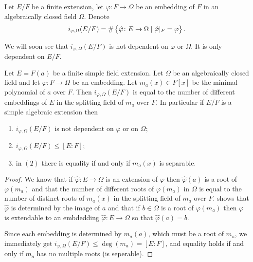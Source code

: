 \documentclass[11pt,a4paper]{article}
\begin{document}
\begin{definition}
  Let $E/F$ be a finite extension,
  let $\varphi \colon F \to \Omega$ be an embedding of $F$ in
  an algebraically closed field $\Omega$.
  Denote
  \[
    i_{\varphi,\Omega}(E/F) =
    \# \left\{\hat \varphi \colon E \to \Omega \mid
    \hat \varphi \vert_F = \varphi\right\}.
  \]
\end{definition}

\begin{remark}
  We will soon see that $i_{\varphi,\Omega}(E/F)$
  is not dependent on $\varphi$ or $\Omega$.
  It is only dependent on $E/F$.
\end{remark}

\begin{lemma}
  \label{lem:i}
  Let $E = F(a)$ be a finite simple field extension.
  Let $\Omega$ be an algebraically closed field and let
  $\varphi \colon F \to \Omega$ be an embedding.
  Let $m_a(x) \in F[x]$ be the minimal polynomial of $a$ over $F$.
  Then $i_{\varphi,\Omega}(E/F)$ is equal to the number of different
  embeddings of $E$ in the splitting field of $m_a$ over $F$.
  In particular if $E/F$ is a simple algebraic extension then
  \begin{enumerate}
    \item[(1)] $i_{\varphi,\Omega}(E/F)$ is not dependent on $\varphi$
      or on $\Omega$;
    \item[(2)] $i_{\varphi,\Omega}(E/F) \le [E : F]$;
    \item[(3)] in $(2)$ there is equality if and only if $m_a(x)$
      is separable.
  \end{enumerate}
\end{lemma}
\begin{proof}
  We know that if $\hat \varphi \colon E \to \Omega$ is an extension
  of $\varphi$ then $\hat \varphi(a)$ is a root of $\varphi(m_a)$
  and that the number of different roots of $\varphi(m_a)$ in $\Omega$
  is equal to the number of distinct roots of $m_a(x)$ in the splitting field
  of $m_a$ over $F$.
  shows that $\hat \varphi$ is determined by the image of $a$ and that
  if $b \in \Omega$ is a root of $\varphi(m_a)$ then $\varphi$ is extendable
  to an embdedding $\hat \varphi \colon E \to \Omega$ so that
  $\hat \varphi(a) = b$.

  Since each embedding is determined by $m_a(a)$,
  which must be a root of $m_a$,
  we immediately get $i_{\varphi,\Omega}(E/F) \le \deg(m_a) = [E : F]$,
  and equality holds if and only if $m_a$ has no multiple roots
  (is seperable).
\end{proof}
\end{document}
